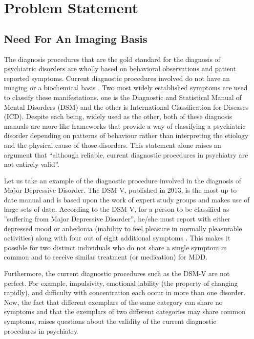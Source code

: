 \documentclass{article}
\begin{document}
\newpage

\section{Problem Statement}

\subsection{Need For An Imaging Basis}

The diagnosis procedures that are the gold standard for the diagnosis
of psychiatric disorders are wholly based on behavioral observations
and patient reported symptoms. Current diagnostic procedures involved
do not have an imaging or a biochemical basis \cite{noimagingbasis}
\cite{nobiochemicalbasis}. Two most widely established symptoms are
used to classify these manifestations, one is the Diagnostic and
Statistical Manual of Mental Disorders (DSM) and the other is
International Classification for Diseases (ICD). Despite each being,
widely used as the other, both of these diagnosis manuals are more
like frameworks that provide a way of classifying a psychiatric
disorder depending on patterns of behaviour rather than interpreting
the etiology and the physical cause of those disorders. This statement
alone raises an argument that “although reliable, current diagnostic
procedures in psychiatry are not entirely valid”.

Let us take an example of the diagnostic procedure involved in the
diagnosis of Major Depressive Disorder. The DSM-V, published in 2013,
is the most up-to-date manual and is based upon the work of expert
study groups and makes use of large sets of data. According to the
DSM-V, for a person to be classified as ”suffering from Major
Depressive Disorder”, he/she must report with either depressed mood or
anhedonia (inability to feel pleasure in normally pleasurable
activities) along with four out of eight additional symptoms
\cite{diagnosticbrainimaging}. This makes it possible for two distinct
individuals who do not share a single symptom in common and to receive
similar treatment (or medication) for MDD.

Furthermore, the current diagnostic procedures such as the DSM-V are
not perfect. For example, impulsivity, emotional lability (the
property of changing rapidly), and difficulty with concentration each
occur in more than one disorder. Now, the fact that different
exemplars of the same category can share no symptoms and that the
exemplars of two different categories may share common symptoms,
raises questions about the validity of the current diagnostic
procedures in psychiatry.
\end{document}
